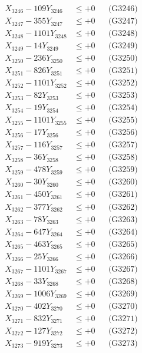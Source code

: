 \documentclass[a4paper,10pt]{article}
\begin{document}
{\begin{align}
X_{3246} - 109Y_{3246} &\leq +0 && \text{(G3246)} \\
X_{3247} - 355Y_{3247} &\leq +0 && \text{(G3247)} \\
X_{3248} - 1101Y_{3248} &\leq +0 && \text{(G3248)} \\
X_{3249} - 14Y_{3249} &\leq +0 && \text{(G3249)} \\
X_{3250} - 236Y_{3250} &\leq +0 && \text{(G3250)} \\
\allowbreak
X_{3251} - 826Y_{3251} &\leq +0 && \text{(G3251)} \\
X_{3252} - 1101Y_{3252} &\leq +0 && \text{(G3252)} \\
X_{3253} - 82Y_{3253} &\leq +0 && \text{(G3253)} \\
X_{3254} - 19Y_{3254} &\leq +0 && \text{(G3254)} \\
X_{3255} - 1101Y_{3255} &\leq +0 && \text{(G3255)} \\
X_{3256} - 17Y_{3256} &\leq +0 && \text{(G3256)} \\
X_{3257} - 116Y_{3257} &\leq +0 && \text{(G3257)} \\
X_{3258} - 36Y_{3258} &\leq +0 && \text{(G3258)} \\
X_{3259} - 478Y_{3259} &\leq +0 && \text{(G3259)} \\
X_{3260} - 30Y_{3260} &\leq +0 && \text{(G3260)} \\
\allowbreak
X_{3261} - 450Y_{3261} &\leq +0 && \text{(G3261)} \\
X_{3262} - 377Y_{3262} &\leq +0 && \text{(G3262)} \\
X_{3263} - 78Y_{3263} &\leq +0 && \text{(G3263)} \\
X_{3264} - 647Y_{3264} &\leq +0 && \text{(G3264)} \\
X_{3265} - 463Y_{3265} &\leq +0 && \text{(G3265)} \\
X_{3266} - 25Y_{3266} &\leq +0 && \text{(G3266)} \\
X_{3267} - 1101Y_{3267} &\leq +0 && \text{(G3267)} \\
X_{3268} - 33Y_{3268} &\leq +0 && \text{(G3268)} \\
X_{3269} - 1006Y_{3269} &\leq +0 && \text{(G3269)} \\
X_{3270} - 402Y_{3270} &\leq +0 && \text{(G3270)} \\
\allowbreak
X_{3271} - 832Y_{3271} &\leq +0 && \text{(G3271)} \\
X_{3272} - 127Y_{3272} &\leq +0 && \text{(G3272)} \\
X_{3273} - 919Y_{3273} &\leq +0 && \text{(G3273)} \\

\end{align}}
\end{document}
